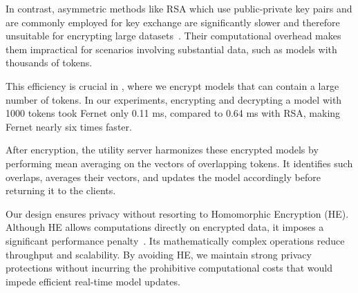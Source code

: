 In contrast, asymmetric methods like RSA which use public-private key pairs and are commonly employed for key exchange are significantly slower and therefore unsuitable for encrypting large datasets~\cite{menezes2018handbook}. Their computational overhead makes them impractical for scenarios involving substantial data, such as \wordvec models with thousands of tokens.

This efficiency is crucial in \Sys, where we encrypt \wordvec models that can contain a large number of tokens. In our experiments, encrypting and decrypting a \wordvec model with 1000 tokens took Fernet only 0.11 ms, compared to 0.64 ms with RSA, making Fernet nearly six times faster.

After encryption, the utility server harmonizes these encrypted models by performing mean averaging on the vectors of overlapping tokens. It identifies such overlaps, averages their vectors, and updates the model accordingly before returning it to the clients.

Our design ensures privacy without resorting to Homomorphic Encryption (HE). Although HE allows computations directly on encrypted data, it imposes a significant performance penalty~\cite{naehrig2011can}. Its mathematically complex operations reduce throughput and scalability. By avoiding HE, we maintain strong privacy protections without incurring the prohibitive computational costs that would impede efficient real-time model updates.




